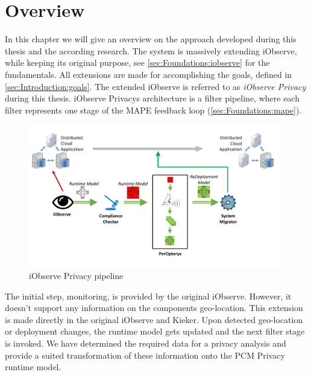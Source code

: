 
\chapter{Overview}
\label{ch:Overview}

In this chapter we will give an overview on the approach developed during this thesis and the according research. The system is massively extending iObserve, while keeping its original purpose, see \autoref{sec:Foundations:iobserve} for the fundamentals. All extensions are made for accomplishing the goals, defined in \autoref{sec:Introduction:goals}. The extended iObserve is referred to as \textit{iObserve Privacy} during this thesis. iObserve Privacys architecture is a filter pipeline, where each filter represents one stage of the MAPE feedback loop (\autoref{sec:Foundations:mape}).


\begin{figure}[h]
	\centering
	\includegraphics[width=0.99\textwidth]{pictures/pipeline}
	\caption{iObserve Privacy pipeline}
	\label{fig:pipeline}
\end{figure}

The initial step, monitoring, is provided by the original iObserve. However, it doesn't support any information on the components geo-location. This extension is made directly in the original iObserve and Kieker. Upon detected geo-location or deployment changes, the runtime model gets updated and the next filter stage is invoked. We have determined the required data for a privacy analysis and provide a suited transformation of these information onto the PCM Privacy runtime model.

